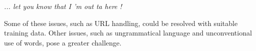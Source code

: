 \vspace{3mm}
\emph{... let you know that I 'm out ta here !}
\vspace{3mm}

Some of these issues, such as URL handling, could be resolved with suitable
training data.  Other issues, such as ungrammatical language and
unconventional use of words, pose a greater challenge.

